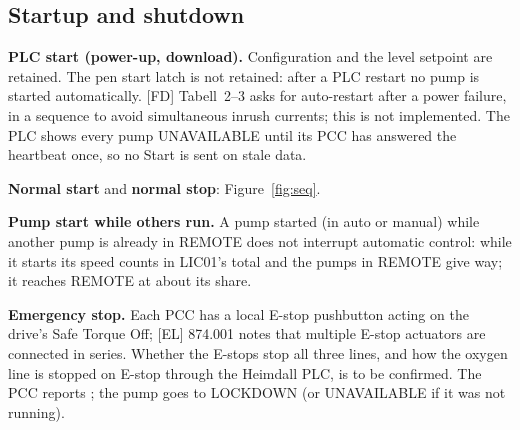 \documentclass[11pt,a4paper]{article}
\begin{document}
\subsection{Startup and shutdown}
\textbf{PLC start (power-up, download).} Configuration and the level setpoint are retained. The pen
start latch is not retained: after a PLC restart no pump is started automatically. [FD] Tabell~2--3
asks for auto-restart after a power failure, in a sequence to avoid simultaneous inrush currents; this
is not implemented. The PLC shows every pump UNAVAILABLE until its PCC has answered the
heartbeat once, so no Start is sent on stale data.

\textbf{Normal start} and \textbf{normal stop}: Figure~\ref{fig:seq}.

\textbf{Pump start while others run.} A pump started (in auto or manual) while another pump is
already in REMOTE does not interrupt automatic control: while it starts its speed counts in LIC01's
total and the pumps in REMOTE give way; it reaches REMOTE at about its share.

\textbf{Emergency stop.} Each PCC has a local E-stop pushbutton acting on the drive's Safe Torque Off;
[EL] 874.001 notes that multiple E-stop actuators are connected in series. Whether the E-stops stop all
three lines, and how the oxygen line is stopped on E-stop through the Heimdall PLC, is to be
confirmed. The PCC reports ; the pump goes to LOCKDOWN (or UNAVAILABLE if it
was not running).
\end{document}
